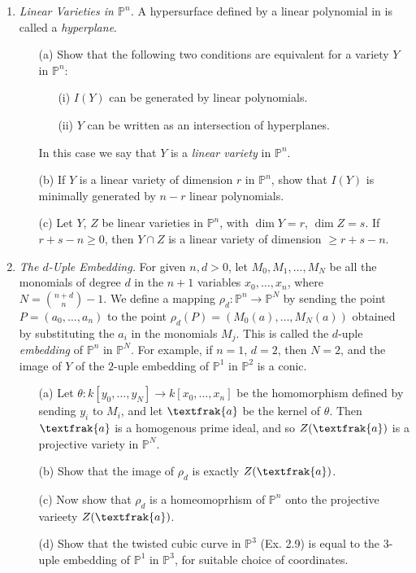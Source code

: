 \documentclass[12pt]{article}
\newcommand{\goth}[1]{\textfrak{#1}}
\newcommand{\PP}{\mathbb{P}}
\theoremstyle{definition}
\begin{document}
\begin{enumerate} [label=\textbf{\arabic*.}, leftmargin=-0.05em]
\item \textit{Linear Varieties in $\PP^n$.} A hypersurface defined by a linear polynomial in is called a \textit{hyperplane}.
\begin{itemize}
    \item[(a)] Show that the following two conditions are equivalent for a variety $Y$ in $\PP^n$:
    \begin{itemize}
        \item[(i)] $I(Y)$ can be generated by linear polynomials.
        \item[(ii)] $Y$ can be written as an intersection of hyperplanes.
    \end{itemize}
    In this case we say that $Y$ is a \textit{linear variety} in $\PP^n$.
    \item[(b)] If $Y$ is a linear variety of dimension $r$ in $\PP^n$, show that $I(Y)$ is minimally generated by $n - r$ linear polynomials.
    \item[(c)] Let $Y$, $Z$ be linear varieties in $\PP^n$, with $\dim{Y} = r$, $\dim{Z} = s$. If $r + s - n \geq 0$, then $Y \cap Z$ is a linear variety of dimension $\geq r + s - n$.
\end{itemize}

\item \textit{The $d$-Uple Embedding.} For given $n, d > 0$, let $M_0, M_1, \dots, M_N$ be all the monomials of degree $d$ in the $n + 1$ variables $x_0, \dots, x_n$, where $N = {n + d \choose n} - 1$. We define a mapping $\rho_d : \PP^n \to \PP^N$ by sending the point $P = (a_0, \dots, a_n)$ to the point $\rho_d(P) = (M_0(a), \dots, M_N(a))$ obtained by substituting the $a_i$ in the monomials $M_j$. This is called the $d$-uple \textit{embedding} of $\PP^n$ in $\PP^N$. For example, if $n = 1$, $d = 2$, then $N = 2$, and the image of $Y$ of the $2$-uple embedding of $\PP^1$ in $\PP^2$ is a conic.
\begin{itemize}
    \item[(a)] Let $\theta : k[y_0, \dots, y_N] \to k[x_0, \dots, x_n]$ be the homomorphism defined by sending $y_i$ to $M_i$, and let $\goth{a}$ be the kernel of $\theta$. Then $\goth{a}$ is a homogenous prime ideal, and so $Z(\goth{a})$ is a projective variety in $\PP^N$.
    \item[(b)] Show that the image of $\rho_d$ is exactly $Z(\goth{a})$.
    \item[(c)] Now show that $\rho_d$ is a homeomoprhism of $\PP^n$ onto the projective varieety $Z(\goth{a})$.
    \item[(d)] Show that the twisted cubic curve in $\PP^3$ (Ex. 2.9) is equal to the $3$-uple embedding of $\PP^1$ in $\PP^3$, for suitable choice of coordinates.
\end{itemize}


\end{enumerate}
\end{document}
